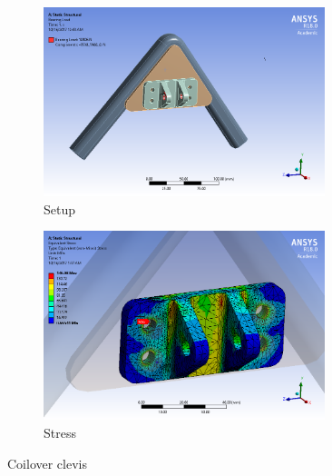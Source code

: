 \documentclass[10pt]{article}
\begin{document}
\begin{figure}[H]
\centering
\begin{subfigure}[b]{.48\textwidth}
\centering
\includegraphics[width=0.9\textwidth]{figures/fea/parts/MS00015-CoiloverClevis-Setup}
\caption{Setup}
\end{subfigure}
\begin{subfigure}[b]{.48\textwidth}
\centering
\includegraphics[width=0.9\textwidth]{figures/fea/parts/MS00015-CoiloverClevis-Stress}
\caption{Stress}
\end{subfigure}
\caption{Coilover clevis}
\label{fig:MS00015-CoiloverClevis}
\end{figure}
\end{document}
